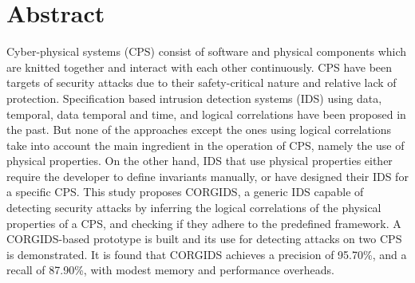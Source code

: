 
\chapter{Abstract}

Cyber-physical systems (CPS) consist of software and physical components which are knitted together and interact with each other continuously. CPS have been targets of security attacks due to their safety-critical nature and relative lack of protection. Specification based intrusion detection systems (IDS) using data, temporal, data temporal and time, and logical correlations have been proposed in the past. But none of the approaches except the ones using logical correlations take into account the main ingredient in the operation of CPS, namely the use of physical properties. On the other hand, IDS that use physical properties either require the developer to define invariants manually, or have designed their IDS for a specific CPS. This study proposes CORGIDS, a generic IDS capable of detecting security attacks by inferring the logical correlations of the physical properties of a CPS, and checking if they adhere to the predefined framework. A CORGIDS-based prototype is built and its use for detecting attacks on two CPS is demonstrated. It is found that CORGIDS achieves a precision of  95.70\%, and a recall of 87.90\%, with modest memory and performance overheads.

